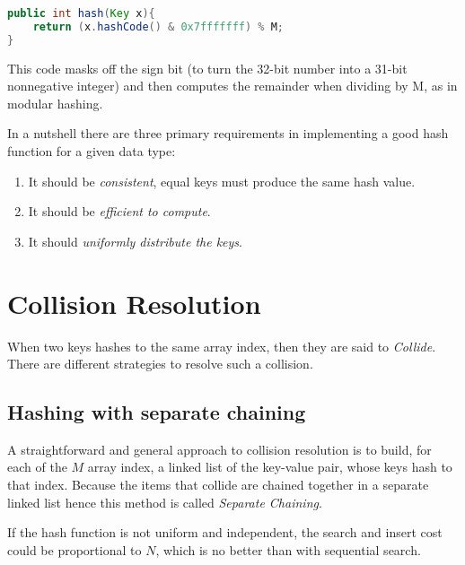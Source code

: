 \documentclass[10pt,a4paper,draft]{article}
\begin{document}
\begin{lstlisting}[language=Java]
public int hash(Key x){
	return (x.hashCode() & 0x7fffffff) % M;
}
\end{lstlisting}

This code masks off the sign bit (to turn the 32-bit number into a 31-bit nonnegative integer) and then computes the remainder when dividing by M, as in modular hashing.

In a nutshell there are three primary requirements in implementing a good hash function for a given data type:
\begin{enumerate}
\item It should be \emph{consistent}, equal keys must produce the same hash value.
\item It should be \emph{efficient to compute}.
\item It should \emph{uniformly distribute the keys}.
\end{enumerate}
\section{Collision Resolution}
When two keys hashes to the same array index, then they are said to \emph{Collide}. There are different strategies to resolve such a collision.
\subsection{Hashing with separate chaining}
A straightforward and general approach to collision resolution is to build, for each of the $M$ array index, a linked list of the key-value pair, whose keys hash to that index. Because the items that collide are chained together in a separate linked list hence this method is called \emph{Separate Chaining}.
\par If the hash function is not uniform and independent, the search and insert cost could be proportional to $N$, which is no better than with sequential search.
\end{document}
